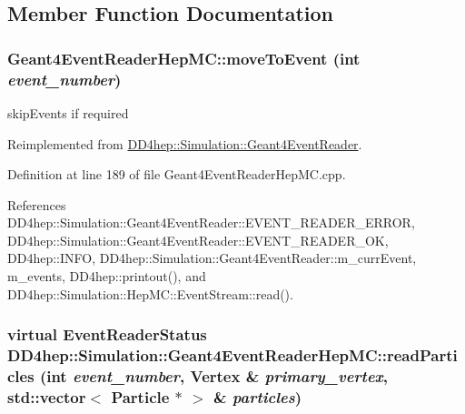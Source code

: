 \subsection{Member Function Documentation}
\hypertarget{class_d_d4hep_1_1_simulation_1_1_geant4_event_reader_hep_m_c_a95ba8736c8274f5b24b6cd0e0b424c33}{
\subsubsection[{moveToEvent}]{ Geant4EventReaderHepMC::moveToEvent (int {\em event\_\-number})}}
\label{class_d_d4hep_1_1_simulation_1_1_geant4_event_reader_hep_m_c_a95ba8736c8274f5b24b6cd0e0b424c33}


skipEvents if required 

Reimplemented from \hyperlink{class_d_d4hep_1_1_simulation_1_1_geant4_event_reader_a0b6d2fe12ae259534cbe7a5b6e35b642}{DD4hep::Simulation::Geant4EventReader}.

Definition at line 189 of file Geant4EventReaderHepMC.cpp.

References DD4hep::Simulation::Geant4EventReader::EVENT\_\-READER\_\-ERROR, DD4hep::Simulation::Geant4EventReader::EVENT\_\-READER\_\-OK, DD4hep::INFO, DD4hep::Simulation::Geant4EventReader::m\_\-currEvent, m\_\-events, DD4hep::printout(), and DD4hep::Simulation::HepMC::EventStream::read().\hypertarget{class_d_d4hep_1_1_simulation_1_1_geant4_event_reader_hep_m_c_acb5e3d21a1eea4870b3dd73649f363ae}{
\subsubsection[{readParticles}]{\setlength{\rightskip}{0pt plus 5cm}virtual {\bf EventReaderStatus} DD4hep::Simulation::Geant4EventReaderHepMC::readParticles (int {\em event\_\-number}, \/  {\bf Vertex} \& {\em primary\_\-vertex}, \/  std::vector$<$ {\bf Particle} $\ast$ $>$ \& {\em particles})}}
\label{class_d_d4hep_1_1_simulation_1_1_geant4_event_reader_hep_m_c_acb5e3d21a1eea4870b3dd73649f363ae}


